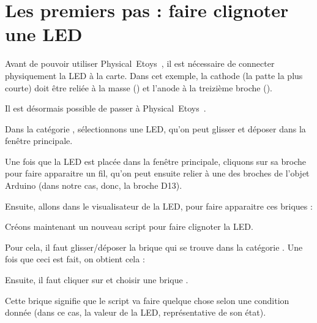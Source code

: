 \documentclass[french]{etoys-guide}
\def\appName{Physical~Etoys~}
\begin{document}

\section{Les premiers pas : faire clignoter une LED}

Avant de pouvoir utiliser \appName, il est nécessaire de connecter
physiquement la LED à la carte.  Dans cet exemple, la cathode (la patte la plus courte) doit être
reliée à la masse () et l'anode à la treizième broche ().




Il est désormais possible de passer à \appName.

Dans la catégorie , sélectionnons une LED, qu'on peut
glisser et déposer dans la fenêtre principale.


Une fois que la LED est placée dans la fenêtre principale, cliquons sur sa
broche \code{+} pour faire apparaitre un fil, qu'on peut ensuite relier à une
des broches de l'objet Arduino (dans notre cas, donc, la broche D13).


Ensuite, allons dans le visualisateur de la LED, pour faire apparaitre ces briques :


Créons maintenant un nouveau script pour faire clignoter la LED.

Pour cela, il faut glisser/déposer la brique  qui se trouve
dans la catégorie . Une fois que ceci est fait, on obtient cela :


Ensuite, il faut cliquer sur  et choisir une
brique \testtile{}.

Cette brique signifie que le script va faire quelque chose selon une condition
donnée (dans ce cas, la valeur de la LED, représentative de son état).
\end{document}
